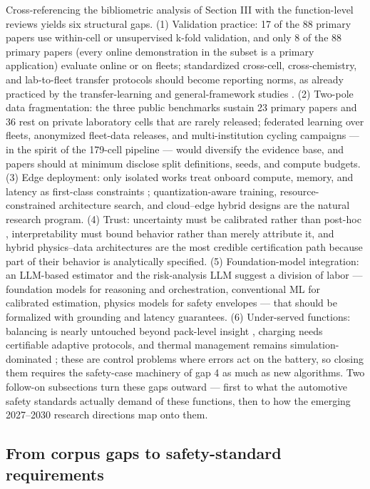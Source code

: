 \documentclass[journal]{IEEEtran}
\begin{document}
Cross-referencing the bibliometric analysis of Section III with the function-level reviews yields six structural gaps. (1) Validation practice: 17 of the 88 primary papers use within-cell or unsupervised k-fold validation, and only 8 of the 88 primary papers (every online demonstration in the subset is a primary application) evaluate online or on fleets; standardized cross-cell, cross-chemistry, and lab-to-fleet transfer protocols should become reporting norms, as already practiced by the transfer-learning and general-framework studies \cite{r69}\cite{r68}. (2) Two-pole data fragmentation: the three public benchmarks sustain 23 primary papers and 36 rest on private laboratory cells that are rarely released; federated learning over fleets, anonymized fleet-data releases, and multi-institution cycling campaigns --- in the spirit of the 179-cell pipeline \cite{r49} --- would diversify the evidence base, and papers should at minimum disclose split definitions, seeds, and compute budgets. (3) Edge deployment: only isolated works treat onboard compute, memory, and latency as first-class constraints \cite{r59}\cite{r105}; quantization-aware training, resource-constrained architecture search, and cloud--edge hybrid designs are the natural research program. (4) Trust: uncertainty must be calibrated rather than post-hoc \cite{r77}, interpretability must bound behavior rather than merely attribute it, and hybrid physics--data architectures are the most credible certification path because part of their behavior is analytically specified. (5) Foundation-model integration: an LLM-based estimator \cite{r15} and the risk-analysis LLM \cite{r14} suggest a division of labor --- foundation models for reasoning and orchestration, conventional ML for calibrated estimation, physics models for safety envelopes --- that should be formalized with grounding and latency guarantees. (6) Under-served functions: balancing is nearly untouched beyond pack-level insight \cite{r30}, charging needs certifiable adaptive protocols, and thermal management remains simulation-dominated \cite{r25}; these are control problems where errors act on the battery, so closing them requires the safety-case machinery of gap 4 as much as new algorithms. Two follow-on subsections turn these gaps outward --- first to what the automotive safety standards actually demand of these functions, then to how the emerging 2027--2030 research directions map onto them.

\subsection{From corpus gaps to safety-standard requirements}
\end{document}
